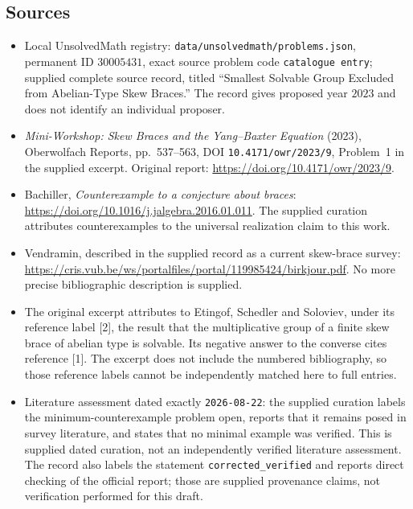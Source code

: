 \documentclass[11pt]{article}
\begin{document}
\subsection{Sources}
\begin{itemize}
\item Local UnsolvedMath registry: \texttt{data/unsolvedmath/problems.json}, permanent ID \(30005431\), exact source problem code \texttt{catalogue entry}; supplied complete source record, titled ``Smallest Solvable Group Excluded from Abelian-Type Skew Braces.'' The record gives proposed year \(2023\) and does not identify an individual proposer.
\item \emph{Mini-Workshop: Skew Braces and the Yang--Baxter Equation} (2023), Oberwolfach Reports, pp.~537--563, DOI \texttt{10.4171/owr/2023/9}, Problem~1 in the supplied excerpt. Original report: \url{https://doi.org/10.4171/owr/2023/9}.
\item Bachiller, \emph{Counterexample to a conjecture about braces}: \url{https://doi.org/10.1016/j.jalgebra.2016.01.011}. The supplied curation attributes counterexamples to the universal realization claim to this work.
\item Vendramin, described in the supplied record as a current skew-brace survey: \url{https://cris.vub.be/ws/portalfiles/portal/119985424/birkjour.pdf}. No more precise bibliographic description is supplied.
\item The original excerpt attributes to Etingof, Schedler and Soloviev, under its reference label [2], the result that the multiplicative group of a finite skew brace of abelian type is solvable. Its negative answer to the converse cites reference [1]. The excerpt does not include the numbered bibliography, so those reference labels cannot be independently matched here to full entries.
\item Literature assessment dated exactly \texttt{2026-08-22}: the supplied curation labels the minimum-counterexample problem open, reports that it remains posed in survey literature, and states that no minimal example was verified. This is supplied dated curation, not an independently verified literature assessment. The record also labels the statement \texttt{corrected\_verified} and reports direct checking of the official report; those are supplied provenance claims, not verification performed for this draft.
\end{itemize}
\end{document}
